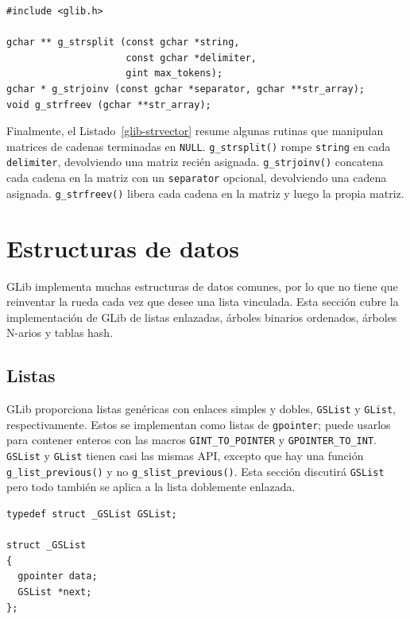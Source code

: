 \begin{lstlisting}[style=GLib/GTK, caption={Manipulación de vectores de cadena terminados en \lstinline{NULL}}, label=glib-strvector]
#include <glib.h>

gchar ** g_strsplit (const gchar *string,
                     const gchar *delimiter,
                     gint max_tokens);
gchar * g_strjoinv (const gchar *separator, gchar **str_array);
void g_strfreev (gchar **str_array);
\end{lstlisting}

Finalmente, el Listado~\ref{glib-strvector} resume algunas rutinas que manipulan matrices de cadenas terminadas en \lstinline{NULL}. \lstinline{g_strsplit()} rompe \lstinline{string} en cada \lstinline{delimiter}, devolviendo una matriz recién asignada. \lstinline{g_strjoinv()} concatena cada cadena en la matriz con un \lstinline{separator} opcional, devolviendo una cadena asignada. \lstinline{g_strfreev()} libera cada cadena en la matriz y luego la propia matriz.

\section{Estructuras de datos}

GLib implementa muchas estructuras de datos comunes, por lo que no tiene que reinventar la rueda cada vez que desee una lista vinculada. Esta sección cubre la implementación de GLib de listas enlazadas, árboles binarios ordenados, árboles N-arios y tablas hash.

\subsection{Listas}

GLib proporciona listas genéricas con enlaces simples y dobles, \lstinline{GSList} y \lstinline{GList}, respectivamente. Estos se implementan como listas de \lstinline{gpointer}; puede usarlos para contener enteros con las macros \lstinline{GINT_TO_POINTER} y \lstinline{GPOINTER_TO_INT}. \lstinline{GSList} y \lstinline{GList} tienen casi las mismas API, excepto que hay una función \lstinline{g_list_previous()} y no \lstinline{g_slist_previous()}. Esta sección discutirá \lstinline{GSList} pero todo también se aplica a la lista doblemente enlazada.

\begin{lstlisting}[style=GLib/GTK, caption={Celda \lstinline{GSList}}, label=glib-gslist-cell]
typedef struct _GSList GSList;

struct _GSList
{
  gpointer data;
  GSList *next;
};
\end{lstlisting}

